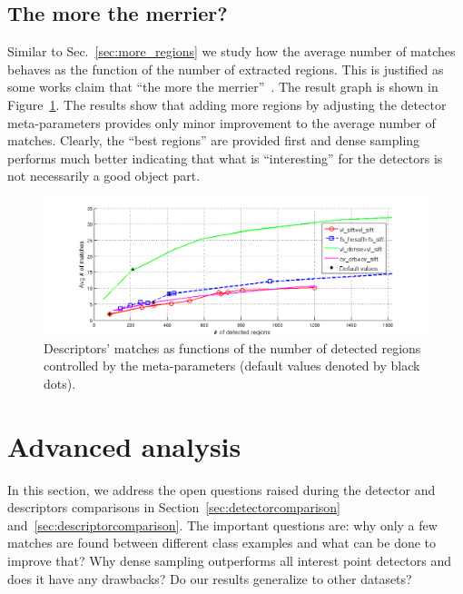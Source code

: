 \documentclass[review]{elsarticle}
\begin{document}
\subsection{The more the merrier?\label{sec:more_matches}}
Similar to Sec.~\ref{sec:more_regions} we study how the average number
of matches behaves as the function of the number of extracted regions.
This is justified as some works claim that
``the more the merrier''~\cite{NowJurTri:2006}. The result graph is shown in
Figure~\ref{fig:more_matches}. The results show that adding more regions
by adjusting the detector meta-parameters provides only minor
improvement to the average number of matches. Clearly, the ``best regions''
are provided first and dense sampling performs much better indicating
that what is ``interesting'' for the detectors is not necessarily a good
object part.
\begin{figure}[h]
  \begin{center}
    \includegraphics[trim=60 0 40 0, clip=true, width=0.8\linewidth]{resources/antti_results/DetectingMoreRegions/DescriptorPlot.png}
    \caption{Descriptors' matches as functions of the number
      of detected regions controlled by the meta-parameters (default values denoted by black dots).
      \label{fig:more_matches}}
  \end{center}
\end{figure}


\section{Advanced analysis}
%
In this section, we address the open questions raised during the
detector and descriptors comparisons in Section~\ref{sec:detectorcomparison}
and~\ref{sec:descriptorcomparison}. The important
questions are: why only a few matches are found between different class
examples and what can be done to improve that? Why dense sampling outperforms
all interest point detectors and does it have any drawbacks? Do our results
generalize to other datasets?

%
\end{document}
